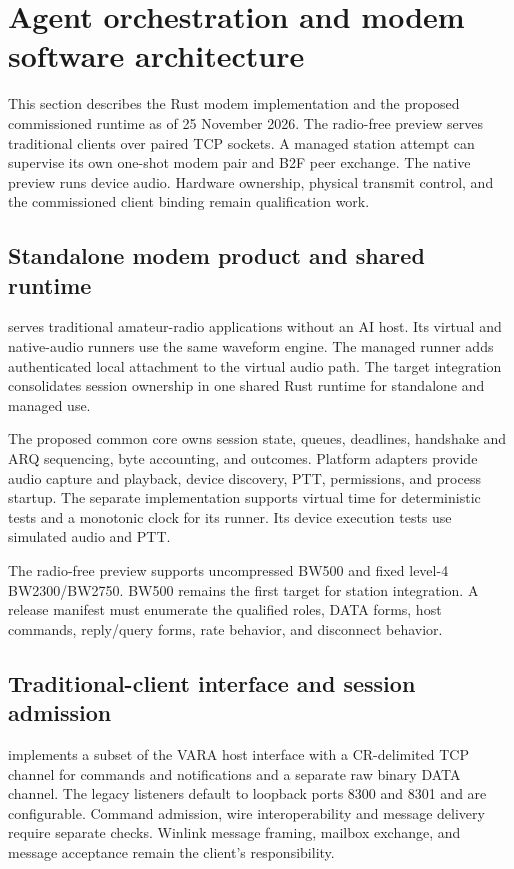 \section{Agent orchestration and modem software architecture}
\label{sec:modem-software}

This section describes the Rust modem implementation and the proposed
commissioned runtime as of 25 November 2026. The radio-free preview serves
traditional clients over paired TCP sockets. A managed station attempt can
supervise its own one-shot modem pair and B2F peer exchange. The native
preview runs device audio. Hardware ownership, physical transmit control,
and the commissioned client binding remain qualification work.

\subsection{Standalone modem product and shared runtime}
\label{sec:modem-shared-runtime}
 serves traditional amateur-radio applications
without an AI host. Its virtual and native-audio runners use the same
waveform engine. The managed runner adds authenticated local attachment to
the virtual audio path. The target integration consolidates session
ownership in one shared Rust runtime for standalone and managed use.

The proposed common core owns session state, queues, deadlines, handshake and ARQ
sequencing, byte accounting, and outcomes. Platform adapters provide audio
capture and playback, device discovery, PTT, permissions, and process startup.
The separate  implementation supports virtual time for
deterministic tests and a monotonic clock for its runner. Its device
execution tests use simulated audio and PTT.

The radio-free preview supports uncompressed BW500 and fixed level-4
BW2300/BW2750. BW500 remains the first target for station integration.
A release manifest must enumerate the qualified roles, DATA forms,
host commands, reply/query forms, rate behavior, and disconnect behavior.

\subsection{Traditional-client interface and session admission}
\label{sec:modem-client-admission}
 implements a subset of the VARA host interface with a
CR-delimited TCP channel for commands and notifications and a separate raw binary DATA
channel. The legacy listeners default to loopback ports 8300 and 8301 and
are configurable. Command admission, wire interoperability and message
delivery require separate checks. Winlink message framing, mailbox
exchange, and message acceptance remain the client's responsibility.

